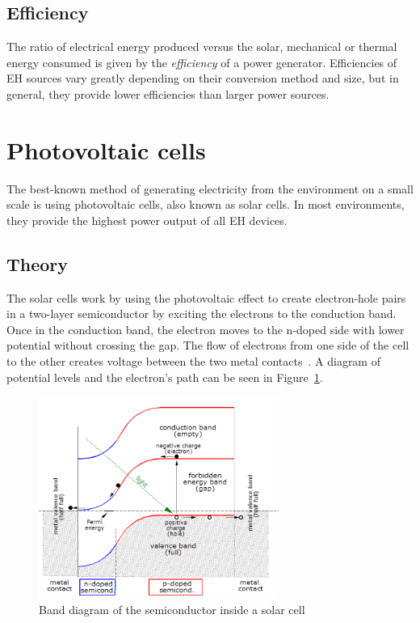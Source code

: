 \documentclass[a4paper,10pt]{article}
\begin{document}
\subsection{Efficiency}

The ratio of electrical energy produced versus the solar, mechanical or thermal energy consumed is given by the {\em efficiency} of a power generator. Efficiencies of \ac{EH} sources vary greatly depending on their conversion method and size, but in general, they provide lower efficiencies than larger power sources. 

\section{Photovoltaic cells}

The best-known method of generating electricity from the environment on a small scale is using photovoltaic cells, also known as solar cells. In most environments, they provide the highest power output of all \ac{EH} devices. 

\subsection{Theory}

The solar cells work by using the photovoltaic effect to create electron-hole pairs in a two-layer semiconductor by exciting the electrons to the conduction band. Once in the conduction band, the electron moves to the n-doped side with lower potential without crossing the gap. The flow of electrons from one side of the cell to the other creates voltage between the two metal contacts~\cite{wiki:solar-cells}. A diagram of potential levels and the electron's path can be seen in Figure~\ref{fig:pv-band-diagram}. 

\begin{figure}[!h]
\centering
\includegraphics[width=0.7\textwidth]{./Slike/PV-band-diagram}
 \caption{Band diagram of the semiconductor inside a solar cell~\cite{wiki:solar-cells}}
\label{fig:pv-band-diagram}
\end{figure}
\end{document}
